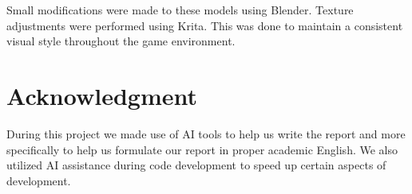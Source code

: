 \documentclass{article}
\begin{document}
Small modifications were made to these models using Blender. Texture adjustments were performed using Krita. This was done to maintain a consistent visual style throughout the game environment.

\section{Acknowledgment}
During this project we made use of AI tools to help us write the report and more
specifically to help us formulate our report in proper academic English. We also
utilized AI assistance during code development to speed up certain aspects of development.

% 
% 
\end{document}
